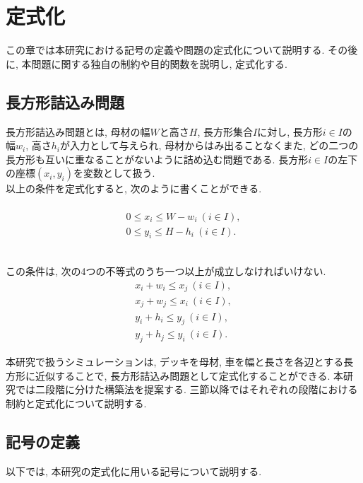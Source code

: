 \chapter{定式化}\label{formulation}

この章では本研究における記号の定義や問題の定式化について説明する. 
その後に, 本問題に関する独自の制約や目的関数を説明し, 定式化する. \\

\section{長方形詰込み問題}
長方形詰込み問題とは, 母材の幅$W$と高さ$H$, 長方形集合$I$に対し, 長方形$i \in I$の幅$w_i$, 高さ$h_i$が入力として与えられ, 母材からはみ出ることなくまた, どの二つの長方形も互いに重なることがないように詰め込む問題である. 
長方形$i \in I$の左下の座標$(x_i, y_i)$を変数として扱う. \\
以上の条件を定式化すると, 次のように書くことができる. \\
\\
\begin{eqnarray}
    0 \leq x_i \leq W-w_i \ (i \in I), \\
    0 \leq y_i \leq H-h_i \ (i \in I). 
\end{eqnarray}

\\
この条件は, 次の4つの不等式のうち一つ以上が成立しなければいけない.  
\begin{eqnarray}
    x_i + w_i \leq x_j \ (i \in I), \\
    x_j + w_j \leq x_i \ (i \in I), \\
    y_i + h_i \leq y_j \ (i \in I), \\
    y_j + h_j \leq y_i \ (i \in I). 
\end{eqnarray}

本研究で扱うシミュレーションは, デッキを母材, 車を幅と長さを各辺とする長方形に近似することで, 長方形詰込み問題として定式化することができる. 
本研究では二段階に分けた構築法を提案する. 
三節以降ではそれぞれの段階における制約と定式化について説明する. 

\clearpage


\section{記号の定義}
以下では, 本研究の定式化に用いる記号について説明する. 

